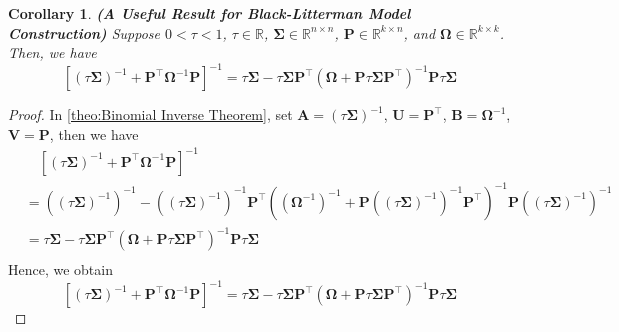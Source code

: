 \documentclass[13pt]{article}
\newtheorem{corollary}[theorem]{Corollary}
\theoremstyle{definition}
\theoremstyle{remark}
\begin{document}
\begin{corollary}\label{coro:black-Litterman Matrix Result} \textbf{(A Useful Result for Black-Litterman Model Construction)}
Suppose $0<\tau<1$, $\tau \in \mathbb{R}$, $\mathbf{\Sigma}\in \mathbb{R}^{n\times n}$, $\mathbf{P}\in \mathbb{R}^{k\times n}$, and $\mathbf{\Omega} \in \mathbb{R}^{k\times k}$. Then, we have
\[
\left[(\tau \mathbf{\Sigma})^{-1}+\mathbf{P}^\top \mathbf{\Omega}^{-1} \mathbf{P}\right]^{-1} = \tau \mathbf{\Sigma}-\tau \mathbf{\Sigma} \mathbf{P}^\top (\mathbf{\Omega}+\mathbf{P}\tau \mathbf{\Sigma} \mathbf{P}^\top)^{-1} \mathbf{P} \tau \mathbf{\Sigma}
\]
\end{corollary}
\begin{proof}
    In \cref{theo:Binomial Inverse Theorem}, set $\mathbf{A}=(\tau \mathbf{\Sigma})^{-1}$, $\mathbf{U}=\mathbf{P}^\top$, $\mathbf{B}=\mathbf{\Omega}^{-1}$, $\mathbf{\mathbf{V}}=\mathbf{P}$, then we have
    \begin{align*}
        &\quad \left[(\tau \mathbf{\Sigma})^{-1}+\mathbf{P}^\top \mathbf{\Omega}^{-1} \mathbf{P}\right]^{-1}\\
        &= \left((\tau \mathbf{\Sigma})^{-1}\right)^{-1}- \left((\tau \mathbf{\Sigma})^{-1}\right)^{-1}\mathbf{P}^\top \left(\left(\mathbf{\Omega}^{-1}\right)^{-1}+\mathbf{P}\left((\tau \mathbf{\Sigma})^{-1}\right)^{-1}\mathbf{P}^\top\right)^{-1}\mathbf{P}\left((\tau \mathbf{\Sigma})^{-1}\right)^{-1}\\
        &=\tau \mathbf{\Sigma}-\tau \mathbf{\Sigma} \mathbf{P}^\top \left(\mathbf{\Omega}+\mathbf{P}\tau \mathbf{\Sigma} \mathbf{P}^\top\right)^{-1}\mathbf{P}\tau \mathbf{\Sigma}\\
    \end{align*}
    Hence, we obtain
    \[
    \left[(\tau \mathbf{\Sigma})^{-1}+\mathbf{P}^\top \mathbf{\Omega}^{-1} \mathbf{P}\right]^{-1} = \tau \mathbf{\Sigma}-\tau \mathbf{\Sigma} \mathbf{P}^\top (\mathbf{\Omega}+\mathbf{P}\tau \mathbf{\Sigma} \mathbf{P}^\top)^{-1} \mathbf{P} \tau \mathbf{\Sigma}
    \]
\end{proof}
\end{document}
